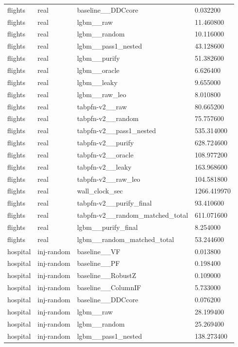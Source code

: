 \begin{tabular}{llll}
flights & real & baseline\_\_DDCcore & 0.032200 \\
flights & real & lgbm\_\_raw & 11.460800 \\
flights & real & lgbm\_\_random & 10.116000 \\
flights & real & lgbm\_\_pass1\_nested & 43.128600 \\
flights & real & lgbm\_\_purify & 51.382600 \\
flights & real & lgbm\_\_oracle & 6.626400 \\
flights & real & lgbm\_\_leaky & 9.655000 \\
flights & real & lgbm\_\_raw\_leo & 8.010800 \\
flights & real & tabpfn-v2\_\_raw & 80.665200 \\
flights & real & tabpfn-v2\_\_random & 75.757600 \\
flights & real & tabpfn-v2\_\_pass1\_nested & 535.314000 \\
flights & real & tabpfn-v2\_\_purify & 628.724600 \\
flights & real & tabpfn-v2\_\_oracle & 108.977200 \\
flights & real & tabpfn-v2\_\_leaky & 163.968600 \\
flights & real & tabpfn-v2\_\_raw\_leo & 104.581800 \\
flights & real & wall\_clock\_sec & 1266.419970 \\
flights & real & tabpfn-v2\_\_purify\_final & 93.410600 \\
flights & real & tabpfn-v2\_\_random\_matched\_total & 611.071600 \\
flights & real & lgbm\_\_purify\_final & 8.254000 \\
flights & real & lgbm\_\_random\_matched\_total & 53.244600 \\
hospital & inj-random & baseline\_\_VF & 0.013800 \\
hospital & inj-random & baseline\_\_PF & 0.198400 \\
hospital & inj-random & baseline\_\_RobustZ & 0.109000 \\
hospital & inj-random & baseline\_\_ColumnIF & 5.733000 \\
hospital & inj-random & baseline\_\_DDCcore & 0.076200 \\
hospital & inj-random & lgbm\_\_raw & 28.199400 \\
hospital & inj-random & lgbm\_\_random & 25.269400 \\
hospital & inj-random & lgbm\_\_pass1\_nested & 138.273400 \\

\end{tabular}
